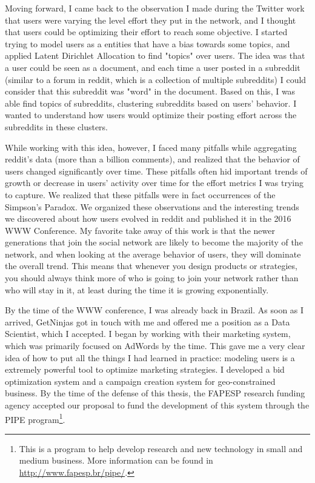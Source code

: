 Moving forward, I came back to the observation I made during the Twitter work that users were varying the level effort they put in the network, and I thought that users could be optimizing their effort to reach some objective. I started trying to model users as a entities that have a bias towards some topics, and applied Latent Dirichlet Allocation to find "topics" over users. The idea was that a user could be seen as a document, and each time a user posted in a subreddit (similar to a forum in reddit, which is a collection of multiple subreddits) I could consider that this subreddit was "word" in the document. Based on this, I was able find topics of subreddits, clustering subreddits based on users' behavior. I wanted to understand how users would optimize their posting effort across the subreddits in these clusters.

While working with this idea, however, I faced many pitfalls while aggregating reddit's data (more than a billion comments), and realized that the behavior of users changed significantly over time. These pitfalls often hid important trends of growth or decrease in users' activity over time for the effort metrics I was trying to capture. We realized that these pitfalls were in fact occurrences of the Simpson's Paradox. We organized these observations and the interesting trends we discovered about how users evolved in reddit and published it in the 2016 WWW Conference. My favorite take away of this work is that the newer generations that join the social network are likely to become the majority of the network, and when looking at the average behavior of users, they will dominate the overall trend. This means that whenever you design products or strategies, you should always think more of who is going to join your network rather than who will stay in it, at least during the time it is growing exponentially.

By the time of the WWW conference, I was already back in Brazil. As soon as I arrived, GetNinjas got in touch with me and offered me a position as a Data Scientist, which I accepted. I began by working with their marketing system, which was primarily focused on AdWords by the time. This gave me a very clear idea of how to put all the things I had learned in practice: modeling users is a extremely powerful tool to optimize marketing strategies. I developed a bid optimization system and a campaign creation system for geo-constrained business. By the time of the defense of this thesis, the FAPESP research funding agency accepted our proposal to fund the development of this system through the PIPE program\footnote{This is a program to help develop research and new technology in small and medium business. More information can be found in \url{http://www.fapesp.br/pipe/}.}.


